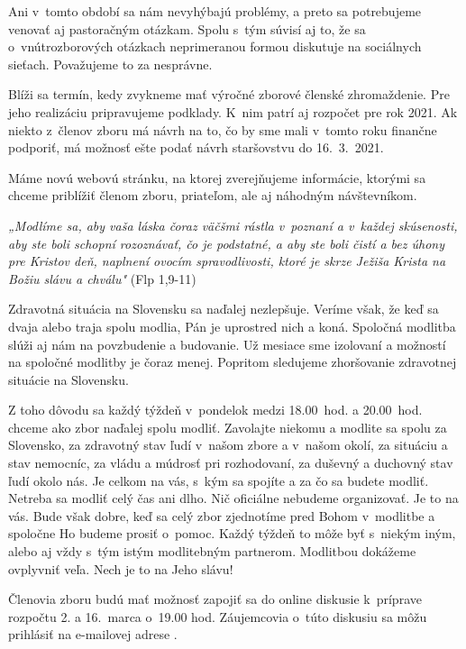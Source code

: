 Ani v~tomto období sa nám nevyhýbajú problémy, a preto sa potrebujeme venovať aj pastoračným otázkam. Spolu s~tým súvisí aj to, že sa o~vnútrozborových otázkach neprimeranou formou diskutuje na sociálnych sieťach. Považujeme to za nesprávne.

Blíži sa termín, kedy zvykneme mať výročné zborové členské zhromaždenie. Pre jeho realizáciu pripravujeme podklady. K~nim patrí aj rozpočet pre rok 2021. Ak niekto z~členov zboru má návrh na to, čo by sme mali v~tomto roku finančne podporiť, má možnosť ešte podať návrh staršovstvu do 16.~3.~2021.

Máme novú webovú stránku, na ktorej zverejňujeme informácie, ktorými sa chceme priblížiť členom zboru, priateľom, ale aj náhodným návštevníkom.

{\it „Modlíme sa, aby vaša láska čoraz väčšmi rástla v~poznaní a v~každej skúsenosti, aby ste boli schopní rozoznávať, čo je podstatné, a aby ste boli čistí a bez úhony pre Kristov deň, naplnení ovocím spravodlivosti, ktoré je skrze Ježiša Krista na Božiu slávu a chválu"} (Flp 1,9-11)



Zdravotná situácia na Slovensku sa naďalej nezlepšuje. Veríme však, že keď sa dvaja alebo traja spolu modlia, Pán je uprostred nich a koná. Spoločná modlitba slúži aj nám na povzbudenie a budovanie. Už mesiace sme izolovaní a možností na spoločné modlitby je čoraz menej. Popritom sledujeme zhoršovanie zdravotnej situácie na Slovensku.

Z toho dôvodu sa každý týždeň v~pondelok medzi 18.00~hod. a 20.00~hod. chceme ako zbor naďalej spolu modliť. Zavolajte niekomu a modlite sa spolu za Slovensko, za zdravotný stav ľudí v~našom zbore a v~našom okolí, za situáciu a stav nemocníc, za vládu a múdrosť pri rozhodovaní, za duševný a duchovný stav ľudí okolo nás. Je celkom na vás, s~kým sa spojíte a za čo sa budete modliť. Netreba sa modliť celý čas ani dlho. Nič oficiálne nebudeme organizovať. Je to na vás. Bude však dobre, keď sa celý zbor zjednotíme pred Bohom v~modlitbe a spoločne Ho budeme prosiť o~pomoc. Každý týždeň to môže byť s~niekým iným, alebo aj vždy s~tým istým modlitebným partnerom. Modlitbou dokážeme ovplyvniť veľa. Nech je to na Jeho slávu!
\vfill\break


Členovia zboru budú mať možnosť zapojiť sa do online diskusie k~príprave rozpočtu 2. a 16.~marca o~19.00 hod. Záujemcovia o~túto diskusiu sa môžu prihlásiť na e-mailovej adrese .


